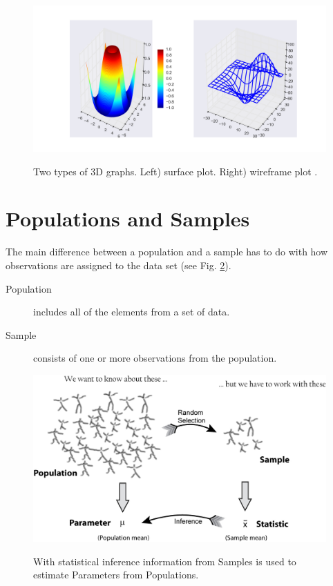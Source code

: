 \begin{figure}[H]
  \centering
  \includegraphics[width=1.0\textwidth]{../Images/3dGraph.png}\\
  \caption{Two types of 3D graphs. Left) surface plot. Right) wireframe plot .}\label{fig:3dplot}
\end{figure}

\section{Populations and Samples}

The main difference between a \gls{population} and a \gls{sample} has to do with how observations are assigned to the data set (see Fig. \ref{fig:population}).

\begin{description}
  \item[Population] includes all of the elements from a set of data.
  \item[Sample] consists of one or more observations from the population.
\end{description}

\begin{figure}
  \centering
  \includegraphics[width=1.0\textwidth]{../Images/PopulationAndSample.jpg}\\
  \caption{With statistical inference information from Samples is used to estimate Parameters from Populations.}\label{fig:population}
\end{figure}

